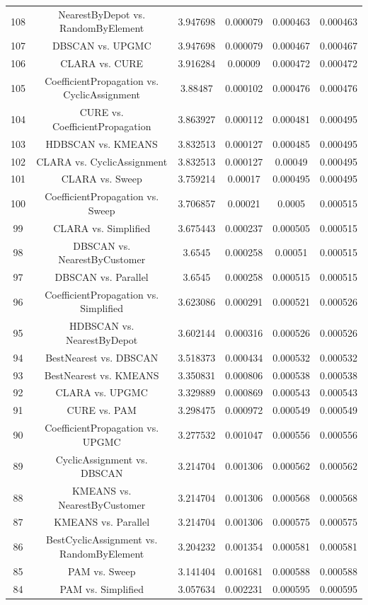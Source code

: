 \documentclass[a4paper,10pt]{article}
\begin{document}
\begin{landscape}
\begin{table}[!htp]
\begin{tabular}{cccccc}
108&NearestByDepot vs. RandomByElement&3.947698&0.000079&0.000463&0.000463\\
107&DBSCAN vs. UPGMC&3.947698&0.000079&0.000467&0.000467\\
106&CLARA vs. CURE&3.916284&0.00009&0.000472&0.000472\\
105&CoefficientPropagation vs. CyclicAssignment&3.88487&0.000102&0.000476&0.000476\\
104&CURE vs. CoefficientPropagation&3.863927&0.000112&0.000481&0.000495\\
103&HDBSCAN vs. KMEANS&3.832513&0.000127&0.000485&0.000495\\
102&CLARA vs. CyclicAssignment&3.832513&0.000127&0.00049&0.000495\\
101&CLARA vs. Sweep&3.759214&0.00017&0.000495&0.000495\\
100&CoefficientPropagation vs. Sweep&3.706857&0.00021&0.0005&0.000515\\
99&CLARA vs. Simplified&3.675443&0.000237&0.000505&0.000515\\
98&DBSCAN vs. NearestByCustomer&3.6545&0.000258&0.00051&0.000515\\
97&DBSCAN vs. Parallel&3.6545&0.000258&0.000515&0.000515\\
96&CoefficientPropagation vs. Simplified&3.623086&0.000291&0.000521&0.000526\\
95&HDBSCAN vs. NearestByDepot&3.602144&0.000316&0.000526&0.000526\\
94&BestNearest vs. DBSCAN&3.518373&0.000434&0.000532&0.000532\\
93&BestNearest vs. KMEANS&3.350831&0.000806&0.000538&0.000538\\
92&CLARA vs. UPGMC&3.329889&0.000869&0.000543&0.000543\\
91&CURE vs. PAM&3.298475&0.000972&0.000549&0.000549\\
90&CoefficientPropagation vs. UPGMC&3.277532&0.001047&0.000556&0.000556\\
89&CyclicAssignment vs. DBSCAN&3.214704&0.001306&0.000562&0.000562\\
88&KMEANS vs. NearestByCustomer&3.214704&0.001306&0.000568&0.000568\\
87&KMEANS vs. Parallel&3.214704&0.001306&0.000575&0.000575\\
86&BestCyclicAssignment vs. RandomByElement&3.204232&0.001354&0.000581&0.000581\\
85&PAM vs. Sweep&3.141404&0.001681&0.000588&0.000588\\
84&PAM vs. Simplified&3.057634&0.002231&0.000595&0.000595\\

\end{tabular}
\end{table}
\end{landscape}
\end{document}
